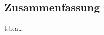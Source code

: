 \vfill

\begin{otherlanguage}{ngerman}
\chapter*{Zusammenfassung}
t.b.a\dots
\end{otherlanguage}

\endgroup

\vfill
